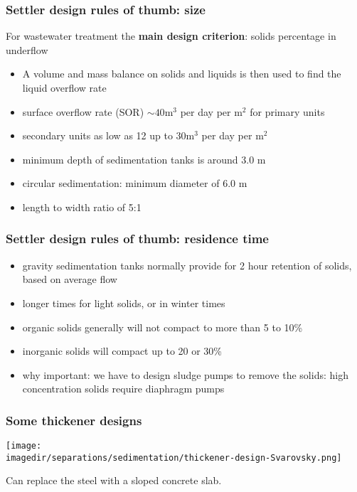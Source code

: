 \begin{frame}\frametitle{Settler design rules of thumb: size}
	
	For wastewater treatment the \textbf{main design criterion}: solids percentage in underflow
	\begin{itemize}
		\item	A volume and mass balance on solids and liquids is then used to find the liquid overflow rate
		\item	surface overflow rate (SOR) $\sim 40 \text{m}^3$ per day per $\text{m}^2$ for primary units
		\item	secondary units as low as 12 up to $30 \text{m}^3$ per day per $\text{m}^2$
		\item	minimum depth of sedimentation tanks is around 3.0 m 
		\item	circular sedimentation: minimum diameter of 6.0 m 
		\item	length to width ratio of 5:1
	\end{itemize} 
\end{frame}

\begin{frame}\frametitle{Settler design rules of thumb: residence time}
	\begin{itemize}
		\item	gravity sedimentation tanks normally provide for 2 hour retention of solids, based on average flow
		\item	longer times for light solids, or in winter times
		\item	organic solids generally will not compact to more than 5 to 10\%
		\item	inorganic solids will compact up to 20 or 30\%
		\item	why important: we have to design sludge pumps to remove the solids: high concentration solids require diaphragm pumps		
	\end{itemize}
\end{frame}

\begin{frame}\frametitle{Some thickener designs}
	\begin{center}
		\texttt{[image: \\imagedir/separations/sedimentation/thickener-design-Svarovsky.png]}
	\end{center}
	
	\vspace{12pt}
	Can replace the steel with a sloped concrete slab.
\end{frame}

